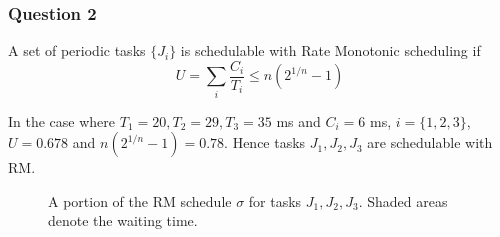\subsubsection{Question 2}

A set of periodic tasks $\{J_i\}$ is schedulable with Rate Monotonic scheduling
if $$U = \sum_{i} \dfrac{C_i}{T_i} \leq n(2^{1/n} - 1)$$

In the case where $T_1 = 20, T_2 = 29, T_3 = 35$ ms and $C_i = 6$ ms,
$i=\{1,2,3\}$, $U=0.678$ and $n(2^{1/n} - 1) = 0.78$. Hence tasks $J_1, J_2, J_3$
are schedulable with RM.

\begin{figure}[H]\centering
  \scalebox{0.7}{}
  \caption{A portion of the RM schedule $\sigma$ for tasks $J_1, J_2, J_3$.
    Shaded areas denote the waiting time.}
\end{figure}
